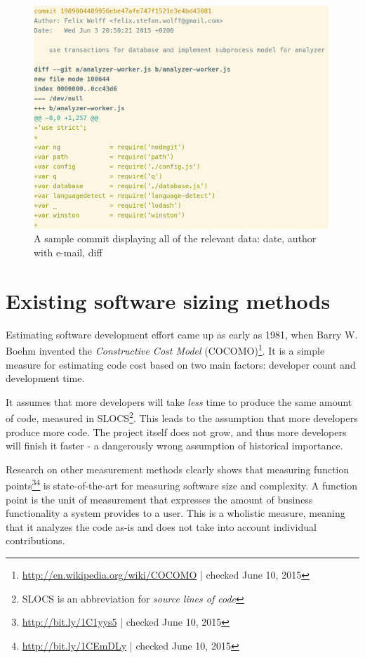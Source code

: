 \begin{figure}
    \includegraphics[width=30em]{gfx/commit.png}
    \caption{A sample commit displaying all of the relevant data: date, author with e-mail, diff}
    \label{fig:commit}
\end{figure}

\section{Existing software sizing methods}
Estimating software development effort came up as early as 1981, when Barry W. Boehm invented the \textit{Constructive Cost Model} (COCOMO)\footnote{\url{http://en.wikipedia.org/wiki/COCOMO} | checked June 10, 2015}.
It is a simple measure for estimating code cost based on two main factors: developer count and development time.
\newline

It assumes that more developers will take \textit{less} time to produce the same amount of code, measured in SLOCS\footnote{SLOCS is an abbreviation for \textit{source lines of code}}. This leads to the assumption that more developers produce more code. The project itself does not grow, and thus more developers will finish it faster - a dangerously wrong assumption of historical importance\cite{fb:1975}.
\newline

Research on other measurement methods clearly shows that measuring function points\footnote{\url{http://bit.ly/1C1yys5} | checked June 10, 2015}\footnote{\url{http://bit.ly/1CEmDLy} | checked June 10, 2015} is state-of-the-art for measuring software size and complexity\cite{linkedin:functionpointstandard}. A function point is the unit of measurement that expresses the amount of business functionality a system provides to a user. This is a wholistic measure, meaning that it analyzes the code as-is and does not take into account individual contributions.

